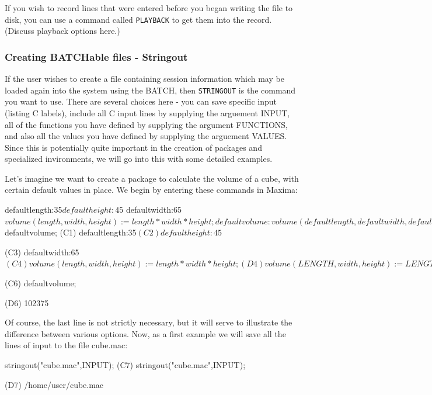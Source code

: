 If you wish to record lines that were entered before you began writing the file to 
disk, you can use a command called \texttt{PLAYBACK} to get them into the record.
(Discuss playback options here.)

\subsubsection{Creating BATCHable files - Stringout}

If the user wishes to create a file containing session information which may be loaded again into the system using the BATCH, then \texttt{STRINGOUT} is the command you want to use.  There are several choices here - you can save specific input (listing C labels), include all C input lines by supplying the arguement INPUT, all of the functions you have defined by supplying the argument FUNCTIONS, and also all the values you have defined by supplying the arguement VALUES.
Since this is potentially quite important in the creation of packages and specialized invironments, we will go into this with some detailed examples.

Let's imagine we want to create a package to calculate the volume of a cube, with certain default values in place.  We begin by entering these
commands in Maxima:

\beginmaximasession
defaultlength:35$
defaultheight:45$
defaultwidth:65$
volume(length,width,height):=length*width*height;
defaultvolume:volume(defaultlength,defaultwidth,defaultheight)$
defaultvolume;
\maximasession
(C1) defaultlength:35$

(C2) defaultheight:45$

(C3) defaultwidth:65$

(C4) volume(length,width,height):=length*width*height;

(D4)         volume(LENGTH, width, height) := LENGTH width height
(C5) defaultvolume:volume(defaultlength,defaultwidth,defaultheight)$

(C6) defaultvolume;

(D6)                                102375
\endmaximasession

Of course, the last line is not strictly necessary, but it will serve to illustrate the difference between various options.  Now, as a first example we will save all the lines of input to the file cube.mac:

\beginmaximasession
stringout("cube.mac",INPUT);
\maximasession
(C7) stringout("cube.mac",INPUT);

(D7)       /home/user/cube.mac
\endmaximasession

